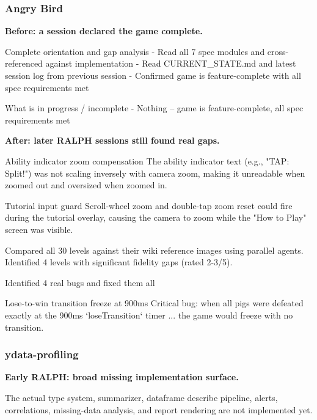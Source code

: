 \documentclass[11pt,a4paper]{article}
\begin{document}
\subsubsection{Angry Bird}

\textbf{Before: a session declared the game complete.}

\begin{cbox}
Complete orientation and gap analysis
- Read all 7 spec modules and cross-referenced against implementation
- Read CURRENT_STATE.md and latest session log from previous session
- Confirmed game is feature-complete with all spec requirements met
\end{cbox}

\begin{cbox}
What is in progress / incomplete
- Nothing -- game is feature-complete, all spec requirements met
\end{cbox}

\textbf{After: later RALPH sessions still found real gaps.}

\begin{cbox}
Ability indicator zoom compensation
The ability indicator text (e.g., "TAP: Split!") was not scaling inversely
with camera zoom, making it unreadable when zoomed out and oversized when zoomed in.

Tutorial input guard
Scroll-wheel zoom and double-tap zoom reset could fire during the tutorial overlay,
causing the camera to zoom while the "How to Play" screen was visible.

Compared all 30 levels against their wiki reference images using parallel agents.
Identified 4 levels with significant fidelity gaps (rated 2-3/5).
\end{cbox}

\begin{cbox}
Identified 4 real bugs and fixed them all

Lose-to-win transition freeze at 900ms
Critical bug: when all pigs were defeated exactly at the 900ms `loseTransition`
timer ... the game would freeze with no transition.
\end{cbox}

\subsubsection{ydata-profiling}

\textbf{Early RALPH: broad missing implementation surface.}

\begin{cbox}
The actual type system, summarizer, dataframe describe pipeline, alerts,
correlations, missing-data analysis, and report rendering are not implemented yet.
\end{cbox}
\end{document}
